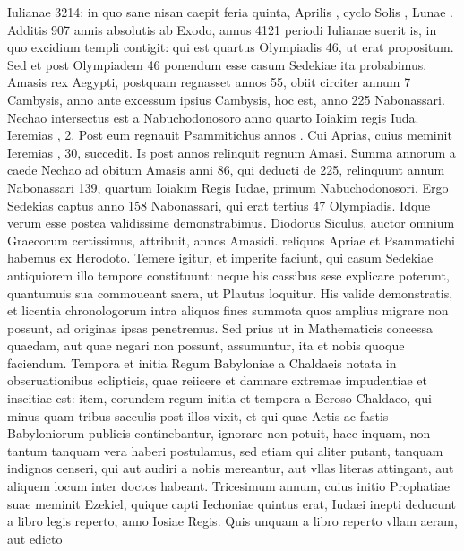 Iulianae 3214: in quo sane nisan caepit feria quinta, Aprilis ,
cyclo Solis , Lunae .
%
Additis 907 annis absolutis ab Exodo,
annus 4121 periodi Iulianae suerit is, in quo excidium templi contigit:
qui est quartus Olympiadis 46, ut erat propositum.
Sed et post
Olympiadem 46 ponendum esse casum Sedekiae ita probabimus.
Amasis rex Aegypti, postquam regnasset annos 55, obiit circiter annum
7 Cambysis, anno ante excessum ipsius Cambysis, hoc est, anno
225 Nabonassari.
Nechao intersectus est a Nabuchodonosoro anno
quarto Ioiakim regis Iuda.
Ieremias , 2.
Post eum regnauit
Psammitichus annos .
Cui Aprias, cuius meminit Ieremias
, 30, succedit.
Is post  annos relinquit regnum Amasi.
Summa annorum a caede Nechao ad obitum Amasis anni 86, qui
deducti de 225, relinquunt annum Nabonassari 139, quartum Ioiakim
Regis Iudae, primum Nabuchodonosori.
Ergo Sedekias captus
anno 158 Nabonassari, qui erat tertius 47 Olympiadis.
Idque verum
esse postea validissime demonstrabimus.
Diodorus Siculus,
auctor omnium Graecorum certissimus, attribuit,  annos Amasidi.
reliquos Apriae et Psammatichi habemus ex Herodoto.
Temere
igitur, et imperite faciunt, qui casum Sedekiae antiquiorem illo
tempore constituunt: neque his cassibus sese explicare poterunt,
quantumuis sua commoueant sacra, ut Plautus loquitur.
His valide
demonstratis, et licentia chronologorum intra aliquos fines summota
quos amplius migrare non possunt, ad originas ipsas penetremus.
Sed prius ut in Mathematicis concessa quaedam, aut quae negari
non possunt, assumuntur, ita et nobis quoque faciendum.
Tempora et initia Regum Babyloniae a Chaldaeis notata in obseruationibus
eclipticis, quae reiicere et damnare extremae impudentiae et
inscitiae est: item, eorundem regum initia et tempora a Beroso Chaldaeo,
qui minus quam tribus saeculis post illos vixit, et qui quae Actis
ac fastis Babyloniorum publicis continebantur, ignorare non potuit,
haec inquam, non tantum tanquam vera haberi postulamus, sed etiam
qui aliter putant, tanquam indignos censeri, qui aut audiri a nobis
mereantur, aut vllas literas attingant, aut aliquem locum inter
doctos habeant.
Tricesimum annum, cuius initio Prophatiae suae
meminit Ezekiel, quique capti Iechoniae quintus erat, Iudaei inepti
deducunt a libro legis reperto, anno  Iosiae Regis.
Quis unquam a libro reperto vllam aeram, aut edicto
